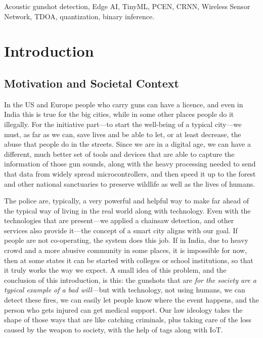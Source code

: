 \documentclass[conference]{IEEEtran}
\begin{document}
\begin{IEEEkeywords}
Acoustic gunshot detection, Edge AI, TinyML, PCEN, CRNN, Wireless Sensor Network, TDOA, quantization,
binary inference.
\end{IEEEkeywords}

\section{Introduction}
\label{sec:intro}

\subsection{Motivation and Societal Context}
In the US and Europe people who carry guns can have a licence, and even in India this is true for the big
cities, while in some other places people do it illegally. For the initiative part---to start the well-being
of a typical city---we must, as far as we can, save lives and be able to let, or at least decrease, the abuse
that people do in the streets. Since we are in a digital age, we can have a different, much better set of
tools and devices that are able to capture the information of those gun sounds, along with the heavy
processing needed to send that data from widely spread microcontrollers, and then speed it up to the forest
and other national sanctuaries to preserve wildlife as well as the lives of humans.

The police are, typically, a very powerful and helpful way to make far ahead of the typical way of living in
the real world along with technology. Even with the technologies that are present---we applied a chainsaw
detection, and other services also provide it---the concept of a smart city aligns with our goal. If people
are not co-operating, the system does this job. If in India, due to heavy crowd and a more abusive community
in some places, it is impossible for now, then at some states it can be started with colleges or school
institutions, so that it truly works the way we expect. A small idea of this problem, and the conclusion of
this introduction, is this: the gunshots that are \textit{for the society are a typical example of a bad
will}---but with technology, not using humans, we can detect these fires, we can easily let people know where
the event happens, and the person who gets injured can get medical support. Our law ideology takes the shape
of those ways that are like catching criminals, plus taking care of the loss caused by the weapon to society,
with the help of tags along with IoT.
\end{document}
